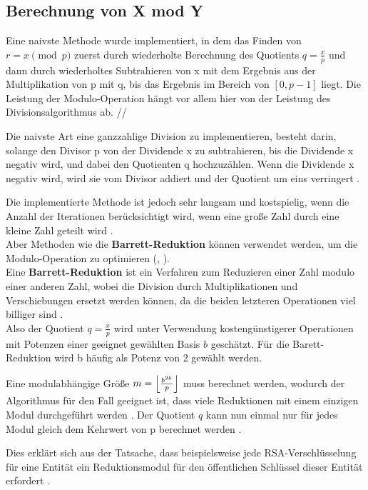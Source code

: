 \subsection{Berechnung von X mod Y}


Eine naivste Methode wurde implementiert, in dem das Finden von $ r = x \pmod p $ zuerst
durch wiederholte Berechnung des Quotients $ q = \frac{x}{p} $ und dann durch
wiederholtes Subtrahieren von x mit dem Ergebnis aus der Multiplikation von p mit q, bis das Ergebnis im Bereich von $ [0, p - 1] $ liegt.
Die Leistung der Modulo-Operation hängt vor allem hier von der Leistung des Divisionsalgorithmus ab. //

Die naivste Art eine ganzzahlige Division zu implementieren, besteht darin,
solange den Divisor p von der Dividende x zu subtrahieren, bis die Dividende x negativ wird, und dabei den Quotienten q hochzuzählen. Wenn die Dividende x negativ wird, wird sie vom Divisor addiert und der Quotient um eins verringert \cite{bericht}. 

Die implementierte Methode ist jedoch sehr langsam und kostspielig, wenn die Anzahl der Iterationen berücksichtigt wird, wenn eine große Zahl durch eine kleine Zahl geteilt wird 
\cite{barett}. \\

Aber Methoden wie die \textbf{Barrett-Reduktion} können verwendet werden, um die Modulo-Operation zu optimieren (\cite{anoops}, \cite{hasenplaugh}).\\

Eine \textbf{Barrett-Reduktion} ist ein Verfahren zum Reduzieren einer Zahl modulo einer anderen Zahl, wobei die Division durch Multiplikationen und Verschiebungen ersetzt werden können, da die beiden letzteren Operationen viel billiger sind \cite{patent}.\\
Also der Quotient  $ q = \frac{x}{p} $ wird unter Verwendung kostengünstigerer Operationen mit Potenzen einer geeignet gewählten Basis $ b $ geschätzt. Für die Barett-Reduktion wird b häufig als Potenz von 2 gewählt werden.

Eine modulabhängige Größe $ m = \floor*{\frac{b^{2k}}{p}} $ muss berechnet werden, wodurch der Algorithmus für den Fall geeignet ist, dass viele Reduktionen mit einem einzigen Modul durchgeführt werden \cite{Hankerson}. Der Quotient $ q $ kann nun einmal nur für jedes Modul gleich dem Kehrwert von p berechnet werden \cite{barett}.

Dies erklärt sich aus der Tatsache, dass beispielsweise jede RSA-Verschlüsselung für eine Entität ein Reduktionsmodul für den öffentlichen Schlüssel dieser Entität erfordert \cite{menezes:1997}. \\

